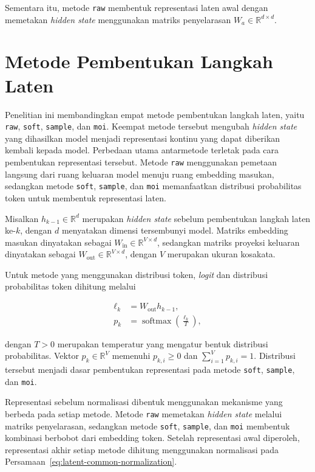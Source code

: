 Sementara itu, metode \texttt{raw} membentuk representasi laten awal
dengan memetakan \textit{hidden state} menggunakan matriks penyelarasan
$W_a\in\mathbb{R}^{d\times d}$.

\section{Metode Pembentukan Langkah Laten}
\label{sec:metode-laten}

Penelitian ini membandingkan empat metode pembentukan langkah laten,
yaitu \texttt{raw}, \texttt{soft}, \texttt{sample}, dan \texttt{moi}.
Keempat metode tersebut mengubah \textit{hidden state} yang dihasilkan
model menjadi representasi kontinu yang dapat diberikan kembali
kepada model. Perbedaan utama antarmetode terletak pada cara
pembentukan representasi tersebut. Metode \texttt{raw} menggunakan
pemetaan langsung dari ruang keluaran model menuju ruang embedding
masukan, sedangkan metode \texttt{soft}, \texttt{sample}, dan
\texttt{moi} memanfaatkan distribusi probabilitas token untuk
membentuk representasi laten.

Misalkan $h_{k-1}\in\mathbb{R}^{d}$ merupakan \textit{hidden state}
sebelum pembentukan langkah laten ke-$k$, dengan $d$ menyatakan
dimensi tersembunyi model. Matriks embedding masukan dinyatakan
sebagai $W_{\mathrm{in}}\in\mathbb{R}^{V\times d}$, sedangkan
matriks proyeksi keluaran dinyatakan sebagai
$W_{\mathrm{out}}\in\mathbb{R}^{V\times d}$, dengan $V$ merupakan
ukuran kosakata.

Untuk metode yang menggunakan distribusi token, \textit{logit} dan
distribusi probabilitas token dihitung melalui

\begin{align}
    \boldsymbol{\ell}_k
    &= W_{\mathrm{out}}h_{k-1}, \\
    p_k
    &=
    \operatorname{softmax}
    \left(
        \frac{\boldsymbol{\ell}_k}{T}
    \right),
    \label{eq:latent-token-distribution}
\end{align}

dengan $T>0$ merupakan temperatur yang mengatur bentuk distribusi
probabilitas. Vektor $p_k\in\mathbb{R}^{V}$ memenuhi
$p_{k,i}\geq 0$ dan
$\sum_{i=1}^{V}p_{k,i}=1$. Distribusi tersebut menjadi dasar
pembentukan representasi pada metode \texttt{soft},
\texttt{sample}, dan \texttt{moi}.

Representasi sebelum normalisasi dibentuk menggunakan mekanisme
yang berbeda pada setiap metode. Metode \texttt{raw} memetakan
\textit{hidden state} melalui matriks penyelarasan, sedangkan metode
\texttt{soft}, \texttt{sample}, dan \texttt{moi} membentuk kombinasi
berbobot dari embedding token. Setelah representasi awal diperoleh,
representasi akhir setiap metode dihitung menggunakan normalisasi
pada Persamaan~\eqref{eq:latent-common-normalization}.



